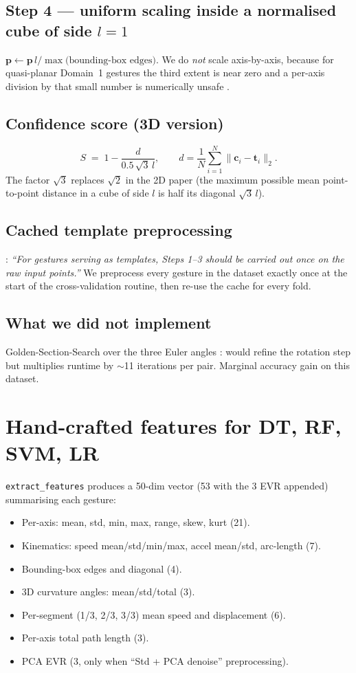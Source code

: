\documentclass[11pt,a4paper]{article}
\begin{document}
\subsection{Step 4 --- uniform scaling inside a normalised cube of
                       side $l=1$}
$\mathbf{p}\leftarrow \mathbf{p}\,l/\max\bigl(\text{bounding-box edges}\bigr)$.
We do \emph{not} scale axis-by-axis, because for quasi-planar Domain~1
gestures the third extent is near zero and a per-axis division by
that small number is numerically unsafe \cite{kratz2010dollar3}.

\subsection{Confidence score (3D version)}
\[
S \;=\; 1 - \frac{d}{0.5 \,\sqrt{3}\, l},
\qquad
d = \frac{1}{N}\sum_{i=1}^{N}\|\mathbf{c}_i - \mathbf{t}_i\|_2.
\]
The factor $\sqrt{3}$ replaces $\sqrt{2}$ in the 2D paper (the maximum
possible mean point-to-point distance in a cube of side $l$ is half
its diagonal $\sqrt{3}\,l$).

\subsection{Cached template preprocessing}
\cite{wobbrock2007dollar1}: \emph{``For gestures serving as templates,
Steps 1--3 should be carried out once on the raw input points.''} We
preprocess every gesture in the dataset exactly once at the start of
the cross-validation routine, then re-use the cache for every fold.

\subsection{What we did not implement}
Golden-Section-Search over the three Euler angles
\cite{kratz2010dollar3}: would refine the rotation step but multiplies
runtime by $\sim$11 iterations per pair. Marginal accuracy gain on
this dataset.

\section{Hand-crafted features for DT, RF, SVM, LR}

\texttt{extract\_features} produces a 50-dim vector (53 with the 3 EVR
appended) summarising each gesture:
\begin{itemize}[itemsep=0.1em,topsep=0.2em]
\item Per-axis: mean, std, min, max, range, skew, kurt (21).
\item Kinematics: speed mean/std/min/max, accel mean/std, arc-length (7).
\item Bounding-box edges and diagonal (4).
\item 3D curvature angles: mean/std/total (3).
\item Per-segment (1/3, 2/3, 3/3) mean speed and displacement (6).
\item Per-axis total path length (3).
\item PCA EVR (3, only when ``Std + PCA denoise'' preprocessing).
\end{itemize}
\end{document}
